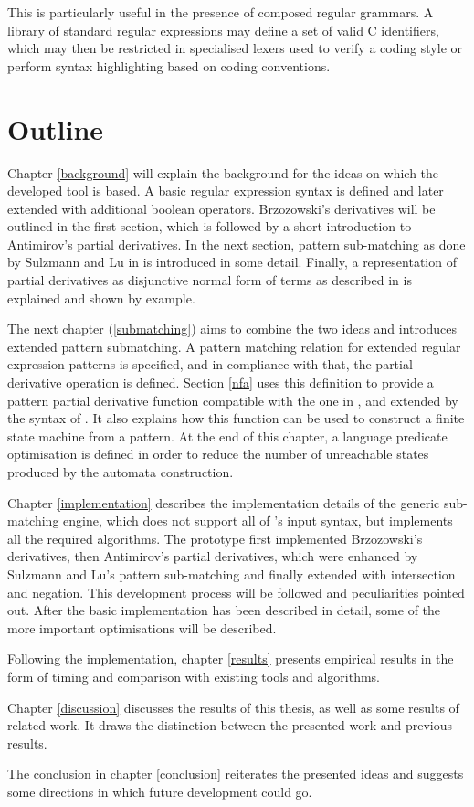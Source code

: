 This is particularly useful in the presence of composed regular grammars. A
library of standard regular expressions may define a set of valid C identifiers,
which may then be restricted in specialised lexers used to verify a coding
style or perform syntax highlighting based on coding conventions.


\section{Outline}

Chapter \ref{background} will explain the background for the ideas on which the
developed tool is based. A basic regular expression syntax is defined and later
extended with additional boolean operators. Brzozowski's derivatives will be
outlined in the first section, which is followed by a short introduction to
Antimirov's partial derivatives. In the next section, pattern sub-matching as
done by Sulzmann and Lu in \cite{pdpat} is introduced in some detail. Finally, a
representation of partial derivatives as disjunctive normal form of terms as
described in \cite{pdere} is explained and shown by example.

The next chapter (\ref{submatching}) aims to combine the two ideas and
introduces extended pattern submatching. A pattern matching relation for
extended regular expression patterns is specified, and in compliance with that,
the partial derivative operation is defined. Section \ref{nfa} uses this
definition to provide a pattern partial derivative function compatible with the
one in \cite{pdpat}, and extended by the syntax of \cite{pdere}. It also
explains how this function can be used to construct a finite state machine from
a pattern. At the end of this chapter, a language predicate optimisation is
defined in order to reduce the number of unreachable states produced by the
automata construction.

Chapter \ref{implementation} describes the implementation details of the generic
sub-matching engine, which does not support all of \reml's input syntax, but
implements all the required algorithms. The prototype first implemented
Brzozowski's derivatives, then Antimirov's partial derivatives, which were
enhanced by Sulzmann and Lu's pattern sub-matching and finally extended with
intersection and negation. This development process will be followed and
peculiarities pointed out. After the basic implementation has been described in
detail, some of the more important optimisations will be described.

Following the implementation, chapter \ref{results} presents empirical results
in the form of timing and comparison with existing tools and algorithms.

Chapter \ref{discussion} discusses the results of this thesis, as well as some
results of related work. It draws the distinction between the presented work and
previous results.

The conclusion in chapter \ref{conclusion} reiterates the presented ideas and
suggests some directions in which future development could go.


